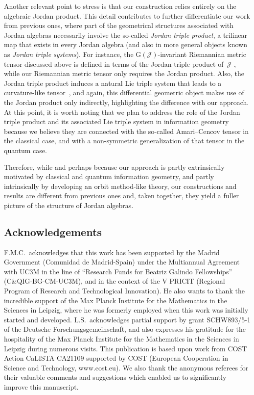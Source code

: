 \documentclass[pdftex]{sigma}
\numberwithin{equation}{section}
\newcommand{\Jcal}{\mathcal{J}}
\newcommand{\G}{\mathrm{G}}
\begin{document}
Another relevant point to stress is that our construction relies entirely on the algebraic Jordan product.
This detail contributes to further differentiate our work from previous ones, where part of the geometrical structures associated with Jordan algebras necessarily involve the so-called \emph{Jordan triple product}, a trilinear map that exists in every Jordan algebra (and also in more general objects known as \emph{Jordan triple systems}).
For instance, the $\G(\Jcal)$-invariant Riemannian metric tensor discussed above is defined in terms of the Jordan triple product of~$\Jcal$ \cite[Theorem~2.3.19]{Chu-2012}, while our Riemannian metric tensor only requires the Jordan product.
Also, the Jordan triple product induces a natural Lie triple system that leads to a curvature-like tensor~\cite{Bertram-2000}, and again, this differential geometric object makes use of the Jordan product only indirectly, highlighting the difference with our approach.
At this point, it is worth noting that we plan to address the role of the Jordan triple product and its associated Lie triple system in information geometry because we believe they are connected with the so-called Amari--Cencov tensor in the classical case, and with a non-symmetric generalization of that tensor in the quantum case.

Therefore, while and perhaps because our approach is partly extrinsically motivated by classical and quantum information geometry, and partly intrinsically by developing an orbit method-like theory, our constructions and results are different from previous ones and, taken together, they yield a fuller picture of the structure of Jordan algebras.

\subsection*{Acknowledgements}

F.M.C.\ acknowledges that this work has been supported by the Madrid Government (Comunidad de Madrid-Spain) under the Multiannual Agreement with UC3M in the line of ``Research Funds for Beatriz Galindo Fellowships'' (C\&QIG-BG-CM-UC3M), and in the context of the V PRICIT (Regional Program of Research and Technological Innovation).
He also wants to thank the incredible support of the Max Planck Institute for the Mathematics in the Sciences in Leipzig, where he was formerly employed when this work was initially started and developed.
L.S.~acknowledges partial support by grant SCHW893/5-1 of the
Deutsche Forschungsgemeinschaft, and also expresses his gratitude for the hospitality of the Max Planck Institute for the Mathematics in the Sciences in Leipzig during numerous visits.
This publication is based upon work from COST Action CaLISTA CA21109 supported by COST (European Cooperation in Science and Technology, www.cost.eu).
We also thank the anonymous referees for their valuable comments and suggestions which enabled us to significantly improve this manuscript.
\end{document}
